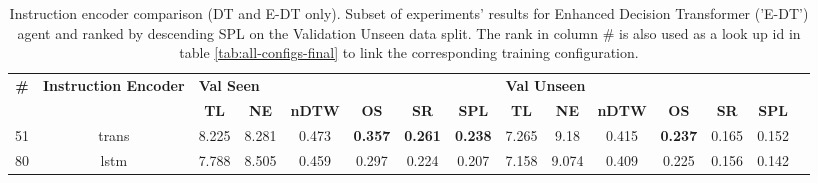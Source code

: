 \begin{table}
\centering
\caption{\label{tab:e_dt_instruction_encoding}Instruction encoder comparison (DT and E-DT only). Subset of experiments' results for Enhanced Decision Transformer ('E-DT') agent and ranked by descending SPL on the Validation Unseen data split. The rank in column \# is also used as a look up id in table \ref{tab:all-configs-final} to link the corresponding training configuration.}
\begin{tabular}{@{\hskip3pt}c@{\hskip3pt}c@{\hskip3pt}c@{\hskip3pt}c@{\hskip3pt}c@{\hskip3pt}c@{\hskip3pt}c@{\hskip3pt}c@{\hskip3pt}c@{\hskip3pt}c@{\hskip3pt}c@{\hskip3pt}c@{\hskip3pt}c@{\hskip3pt}c@{\hskip3pt}c}
\toprule
\textbf{\#} & \textbf{Instruction Encoder} & \multicolumn{6}{l}{\textbf{Val Seen}} & \multicolumn{6}{l}{\textbf{Val Unseen}} \\
 \textbf{~} &                   \textbf{~} &       \textbf{TL} & \textbf{NE} & \textbf{nDTW} &     \textbf{OS} &     \textbf{SR} &    \textbf{SPL} &         \textbf{TL} & \textbf{NE} & \textbf{nDTW} &     \textbf{OS} & \textbf{SR} & \textbf{SPL} \\
\midrule
         51 &                        trans &             8.225 &       8.281 &         0.473 &  \textbf{0.357} &  \textbf{0.261} &  \textbf{0.238} &               7.265 &        9.18 &         0.415 &  \textbf{0.237} &       0.165 &        0.152 \\
         80 &                         lstm &             7.788 &       8.505 &         0.459 &           0.297 &           0.224 &           0.207 &               7.158 &       9.074 &         0.409 &           0.225 &       0.156 &        0.142 \\
\bottomrule
\end{tabular}
\end{table}
